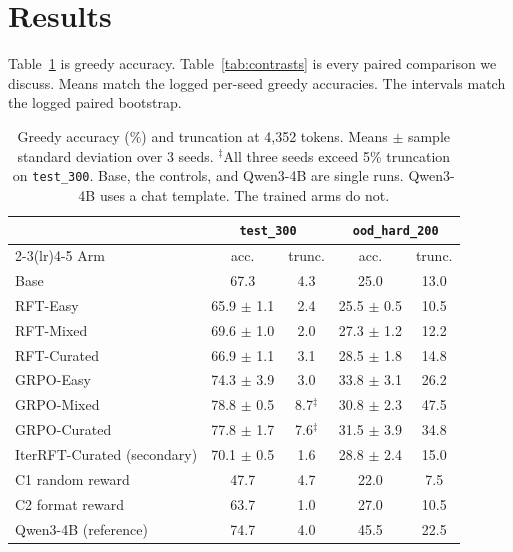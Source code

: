 \section{Results}
\label{sec:results}

Table~\ref{tab:main} is greedy accuracy. Table~\ref{tab:contrasts} is every paired comparison we discuss. Means match the logged per-seed greedy accuracies. The intervals match the logged paired bootstrap.

\begin{table}[t]
\centering
{\small
\begin{tabular}{lcccc}
\toprule
 & \multicolumn{2}{c}{\texttt{test\_300}} & \multicolumn{2}{c}{\texttt{ood\_hard\_200}} \\
\cmidrule(lr){2-3}\cmidrule(lr){4-5}
Arm & acc. & trunc. & acc. & trunc. \\
\midrule
Base & 67.3 & 4.3 & 25.0 & 13.0 \\
RFT-Easy & 65.9 $\pm$ 1.1 & 2.4 & 25.5 $\pm$ 0.5 & 10.5 \\
RFT-Mixed & 69.6 $\pm$ 1.0 & 2.0 & 27.3 $\pm$ 1.2 & 12.2 \\
RFT-Curated & 66.9 $\pm$ 1.1 & 3.1 & 28.5 $\pm$ 1.8 & 14.8 \\
GRPO-Easy & 74.3 $\pm$ 3.9 & 3.0 & 33.8 $\pm$ 3.1 & 26.2 \\
GRPO-Mixed & 78.8 $\pm$ 0.5 & 8.7$^\ddagger$ & 30.8 $\pm$ 2.3 & 47.5 \\
GRPO-Curated & 77.8 $\pm$ 1.7 & 7.6$^\ddagger$ & 31.5 $\pm$ 3.9 & 34.8 \\
\midrule
IterRFT-Curated (secondary) & 70.1 $\pm$ 0.5 & 1.6 & 28.8 $\pm$ 2.4 & 15.0 \\
C1 random reward & 47.7 & 4.7 & 22.0 & 7.5 \\
C2 format reward & 63.7 & 1.0 & 27.0 & 10.5 \\
\midrule
Qwen3-4B (reference) & 74.7 & 4.0 & 45.5 & 22.5 \\
\bottomrule
\end{tabular}
}
\caption{Greedy accuracy (\%) and truncation at 4{,}352 tokens. Means $\pm$ sample standard deviation over 3 seeds. $^\ddagger$All three seeds exceed 5\% truncation on \texttt{test\_300}. Base, the controls, and Qwen3-4B are single runs. Qwen3-4B uses a chat template. The trained arms do not.}
\label{tab:main}
\end{table}

